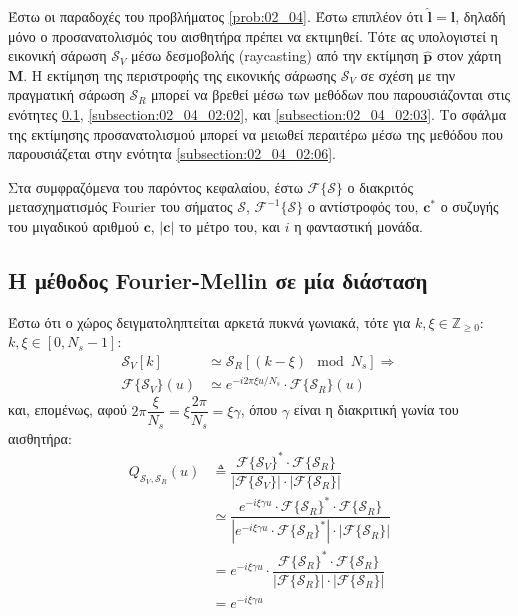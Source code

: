 Έστω οι παραδοχές του προβλήματος \ref{prob:02_04}. Έστω επιπλέον ότι $\hat{\bm{l}} =
\bm{l}$, δηλαδή μόνο ο προσανατολισμός του αισθητήρα πρέπει να εκτιμηθεί. Τότε
ας υπολογιστεί η εικονική σάρωση $\mathcal{S}_V$ μέσω δεσμοβολής (raycasting)
από την εκτίμηση $\hat{\bm{p}}$ στον χάρτη $\bm{M}$. Η εκτίμηση της περιστροφής
της εικονικής σάρωσης $\mathcal{S}_V$ σε σχέση με την πραγματική σάρωση
$\mathcal{S}_R$ μπορεί να βρεθεί μέσω των μεθόδων που παρουσιάζονται στις
ενότητες \ref{subsection:02_04_02:01}, \ref{subsection:02_04_02:02}, και
\ref{subsection:02_04_02:03}. Το σφάλμα της εκτίμησης προσανατολισμού μπορεί να
μειωθεί περαιτέρω μέσω της μεθόδου που παρουσιάζεται στην ενότητα
\ref{subsection:02_04_02:06}.

Στα συμφραζόμενα του παρόντος κεφαλαίου, έστω $\mathcal{F}\{\mathcal{S}\}$ ο
διακριτός μετασχηματισμός Fourier του σήματος $\mathcal{S}$,
$\mathcal{F}^{-1}\{\mathcal{S}\}$ ο αντίστροφός του, $\bm{c}^\ast$ ο συζυγής
του μιγαδικού αριθμού $\bm{c}$, $|\bm{c}|$ το μέτρο του, και $i$ η φανταστική
μονάδα.

\subsection{Η μέθοδος Fourier-Mellin σε μία διάσταση}
\label{subsection:02_04_02:01}

Έστω ότι ο χώρος δειγματοληπτείται αρκετά πυκνά γωνιακά, τότε για
$k,\xi \in \mathbb{Z}_{\geq 0}$: $k,\xi \in [0, N_s-1]$:
\begin{align}
  \mathcal{S}_V[k] &\simeq \mathcal{S}_R[(k - \xi) \mod N_s] \Rightarrow \nonumber \\
  \mathcal{F}\{\mathcal{S}_V\}(u) &\simeq e^{-i 2\pi \xi u / N_s} \cdot \mathcal{F}\{\mathcal{S}_R\}(u) \nonumber
\end{align}
και, επομένως, αφού $2\pi \dfrac{\xi}{N_s} = \xi \dfrac{2\pi}{N_s} = \xi \gamma$,
όπου $\gamma$ είναι η διακριτική γωνία του αισθητήρα:
\begin{align}
  Q_{\mathcal{S}_V, \mathcal{S}_R}(u) & \triangleq \dfrac{\mathcal{F}\{\mathcal{S}_V\}^{\ast} \cdot \mathcal{F}\{\mathcal{S}_R\}}{|\mathcal{F}\{\mathcal{S}_V\}| \cdot |\mathcal{F}\{\mathcal{S}_R\}|} \nonumber \\
  &\simeq \dfrac{e^{-i \xi \gamma u} \cdot \mathcal{F}\{\mathcal{S}_R\}^\ast \cdot \mathcal{F}\{\mathcal{S}_R\}}{|e^{- i \xi \gamma u} \cdot \mathcal{F}\{\mathcal{S}_R\}^\ast | \cdot | \mathcal{F}\{\mathcal{S}_R\}|} \nonumber \\
  &= e^{-i \xi \gamma u} \cdot \dfrac{\mathcal{F}\{\mathcal{S}_R\}^\ast \cdot \mathcal{F}\{\mathcal{S}_R\}}{|\mathcal{F}\{\mathcal{S}_R\} | \cdot | \mathcal{F}\{\mathcal{S}_R\}|} \nonumber \\
  &= e^{-i \xi \gamma u}
  \label{eq:Q0}
\end{align}


